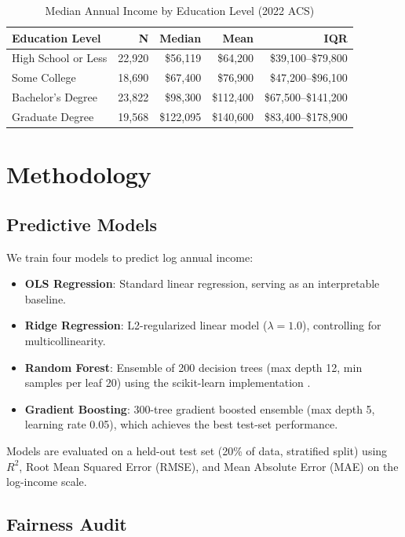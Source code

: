 \documentclass[11pt]{article}
\begin{document}
\begin{table}[h!]
\centering
\caption{Median Annual Income by Education Level (2022 ACS)}
\label{tab:descriptive}
\begin{tabular}{lrrrr}
\toprule
Education Level & N & Median & Mean & IQR \\
\midrule
High School or Less & 22,920 & \$56,119 & \$64,200 & \$39,100--\$79,800 \\
Some College & 18,690 & \$67,400 & \$76,900 & \$47,200--\$96,100 \\
Bachelor's Degree & 23,822 & \$98,300 & \$112,400 & \$67,500--\$141,200 \\
Graduate Degree & 19,568 & \$122,095 & \$140,600 & \$83,400--\$178,900 \\
\bottomrule
\end{tabular}
\end{table}

\section{Methodology}

\subsection{Predictive Models}

We train four models to predict log annual income:

\begin{itemize}
    \item \textbf{OLS Regression}: Standard linear regression, serving as an
    interpretable baseline.
    \item \textbf{Ridge Regression}: L2-regularized linear model
    ($\lambda = 1.0$), controlling for multicollinearity.
    \item \textbf{Random Forest}: Ensemble of 200 decision trees
    (max depth 12, min samples per leaf 20) using the scikit-learn
    implementation \citep{pedregosa2011scikit}.
    \item \textbf{Gradient Boosting}: 300-tree gradient boosted ensemble
    (max depth 5, learning rate 0.05), which achieves the best test-set
    performance.
\end{itemize}

Models are evaluated on a held-out test set (20\% of data, stratified split)
using $R^2$, Root Mean Squared Error (RMSE), and Mean Absolute Error (MAE)
on the log-income scale.

\subsection{Fairness Audit}
\end{document}
